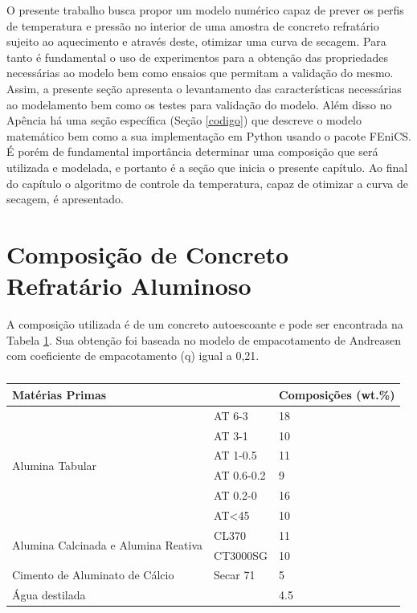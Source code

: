 O presente trabalho busca propor um modelo numérico capaz de prever os perfis de
temperatura e pressão no interior de uma amostra de concreto refratário sujeito
ao aquecimento e através deste, otimizar uma curva de secagem. Para tanto é
fundamental o uso de experimentos para a obtenção das propriedades necessárias
ao modelo bem como ensaios que permitam a validação do mesmo. Assim, a presente
seção apresenta o levantamento das características necessárias ao modelamento
bem como os testes para validação do modelo. Além disso no Apência há uma seção
específica (Seção \ref{codigo}) que descreve o modelo matemático bem como a sua
implementação em Python usando o pacote FEniCS. É porém de fundamental
importância determinar uma composição que será utilizada e modelada, e portanto
é a seção que inicia o presente capítulo. Ao final do capítulo o algoritmo de
controle da temperatura, capaz de otimizar a curva de secagem, é apresentado.

\section{Composição de Concreto Refratário Aluminoso}
A composição utilizada é de um concreto autoescoante e pode ser encontrada na
Tabela \ref{tab:composition}. Sua obtenção foi baseada no modelo de
empacotamento de Andreasen com coeficiente de empacotamento (q) igual a 0,21.

\begin{table}[]
\centering
\caption{}
\label{tab:composition}
\begin{tabular}{|l|l|l|}
  \hline
  \multicolumn{2}{|l|}{Matérias Primas}                         & Composições (wt.\%) \\ \hline
  \multirow{6}{*}{Alumina Tabular}               & AT 6-3     & 18                  \\ \cline{2-3} 
                                                                & AT 3-1     & 10                  \\ \cline{2-3} 
                                                                & AT 1-0.5   & 11                  \\ \cline{2-3} 
                                                                & AT 0.6-0.2 & 9                   \\ \cline{2-3} 
                                                                & AT 0.2-0   & 16                  \\ \cline{2-3} 
                                                                & AT<45      & 10                  \\ \hline
  \multirow{2}{*}{Alumina Calcinada e Alumina Reativa} & CL370      & 11                  \\ \cline{2-3} 
                                                                & CT3000SG   & 10                  \\ \hline
  Cimento de Aluminato de Cálcio                       & Secar 71   & 5                   \\ \hline
  Água destilada                                &            & 4.5                 \\ \hline
\end{tabular}
\end{table}

